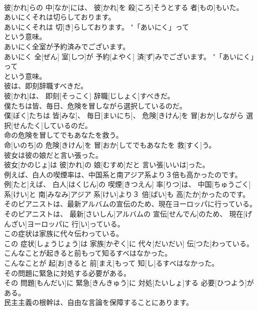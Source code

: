 \documentclass[8pt]{extreport}
\begin{document}
\begin{CJK}{UTF8}{min}
\\	彼[かれ]らの 中[なか]には、 彼[かれ]を 殺[ころ]そうとする 者[もの]もいた。	
\\	あいにくそれは切らしております。	
\\	あいにくそれは 切[き]らしております。	"「あいにく」って 
\\	という意味。
\\	あいにく全室が予約済みでございます。	
\\	あいにく 全[ぜん] 室[しつ]が 予約[よやく] 済[ず]みでございます。	"「あいにく」って 
\\	という意味。
\\	彼は、即刻辞職すべきだ。	
\\	彼[かれ]は、 即刻[そっこく] 辞職[じしょく]すべきだ。	
\\	僕たちは皆、毎日、危険を冒しながら選択しているのだ。	
\\	僕[ぼく]たちは 皆[みな]、 毎日[まいにち]、 危険[きけん]を 冒[おか]しながら 選択[せんたく]しているのだ。	
\\	命の危険を冒してでもあなたを救う。	
\\	命[いのち]の 危険[きけん]を 冒[おか]してでもあなたを 救[すく]う。	
\\	彼女は彼の娘だと言い張った。	
\\	彼女[かのじょ]は 彼[かれ]の 娘[むすめ]だと 言い張[いいは]った。	
\\	例えば、白人の喫煙率は、中国系と南アジア系より３倍も高かったのです。	
\\	例[たと]えば、 白人[はくじん]の 喫煙[きつえん] 率[りつ]は、 中国[ちゅうごく] 系[けい]と 南[みなみ]アジア 系[けい]より３ 倍[ばい]も 高[たか]かったのです。	
\\	そのピアニストは、最新アルバムの宣伝のため、現在ヨーロッパに行っている。	
\\	そのピアニストは、 最新[さいしん]アルバムの 宣伝[せんでん]のため、 現在[げんざい]ヨーロッパに 行[い]っている。	
\\	この症状は家族に代々伝わっている。	
\\	この 症状[しょうじょう]は 家族[かぞく]に 代々[だいだい] 伝[つた]わっている。	
\\	こんなことが起きると前もって知るすべはなかった。	
\\	こんなことが 起[お]きると 前[まえ]もって 知[し]るすべはなかった。	
\\	その問題に緊急に対処する必要がある。	
\\	その 問題[もんだい]に 緊急[きんきゅう]に 対処[たいしょ]する 必要[ひつよう]がある。	
\\	民主主義の根幹は、自由な言論を保障することにあります。	

\end{CJK}
\end{document}
